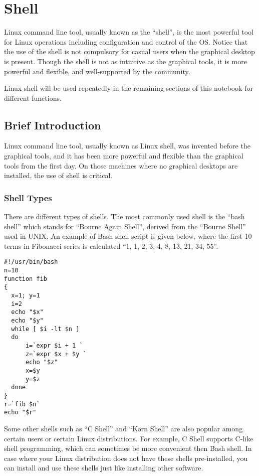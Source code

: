 \chapter{Shell}

Linux command line tool, usually known as the ``shell'', is the most powerful tool for Linux operations including configuration and control of the OS. Notice that the use of the shell is not compulsory for casual users when the graphical desktop is present. Though the shell is not as intuitive as the graphical tools, it is more powerful and flexible, and well-supported by the community.

Linux shell will be used repeatedly in the remaining sections of this notebook for different functions.

\section{Brief Introduction}

Linux command line tool, usually known as Linux shell, was invented before the graphical tools, and it has been more powerful and flexible than the graphical tools from the first day. On those machines where no graphical desktops are installed, the use of shell is critical.

\subsection{Shell Types}

There are different types of shells. The most commonly used shell is the ``bash shell'' which stands for ``Bourne Again Shell'', derived from the ``Bourne Shell'' used in UNIX. An example of Bash shell script is given below, where the first 10 terms in Fibonacci series is calculated ``1, 1, 2, 3, 4, 8, 13, 21, 34, 55''.

\begin{verbatim}
#!/usr/bin/bash
n=10
function fib
{
  x=1; y=1
  i=2
  echo "$x"
  echo "$y"
  while [ $i -lt $n ]
  do
      i=`expr $i + 1 `
      z=`expr $x + $y `
      echo "$z"
      x=$y
      y=$z
  done
}
r=`fib $n`
echo "$r"
\end{verbatim}

Some other shells such as ``C Shell'' and ``Korn Shell'' are also popular among certain users or certain Linux distributions. For example, C Shell supports C-like shell programming, which can sometimes be more convenient then Bash shell. In case where your Linux distribution does not have these shells pre-installed, you can install and use these shells just like installing other software.

